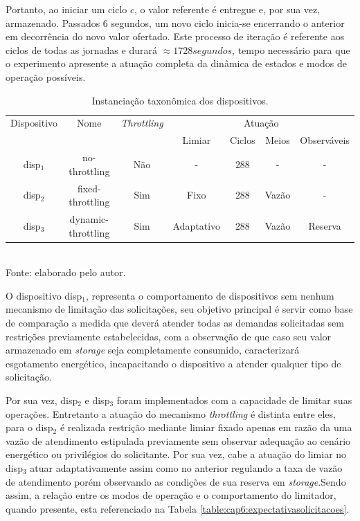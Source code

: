 Portanto, ao iniciar um ciclo $c$, o valor referente é entregue e, por sua vez, armazenado. Passados 6 segundos, um novo ciclo inicia-se encerrando o anterior em decorrência do novo valor ofertado. Este processo de iteração é referente aos ciclos de todas as jornadas e durará $\approx 1728 segundos$, tempo necessário para que o experimento apresente a atuação completa da dinâmica de estados e modos de operação possíveis.

\begingroup
\begin{table}[htbp]
	
	\centering
	\caption{Instanciação taxonômica dos dispositivos.}
	\small
	\begin{tabular}{ c c c c c c c}
		\toprule
		Dispositivo & Nome & \textit{Throttling} & \multicolumn{4}{c}{Atuação}\\\cline{4-7}		
		& & & Limiar & Ciclos & Meios & Observáveis\\
		\midrule
		disp$_1$ & no-throttling  & Não & - & 288 & - & - \\
		disp$_2$ & fixed-throttling  & Sim & Fixo & 288 & Vazão & - \\
		disp$_3$ & dynamic-throttling  & Sim & Adaptativo & 288 & Vazão & Reserva \\
		\bottomrule
	\end{tabular}
	\label{table:cap6:dispositivosutilizados}
	\\
	\footnotesize Fonte: elaborado pelo autor.
	
\end{table}
\endgroup

O dispositivo disp$_1$, representa o comportamento de dispositivos sem nenhum mecanismo de limitação das solicitações, seu objetivo principal é servir como base de comparação a medida que deverá atender todas as demandas solicitadas sem restrições previamente estabelecidas, com a observação de que caso seu valor armazenado em \textit{storage} seja completamente consumido, caracterizará esgotamento energético, incapacitando o dispositivo a atender qualquer tipo de solicitação.

Por sua vez, disp$_2$  e disp$_3$ foram implementados com a capacidade de limitar suas operações. Entretanto a atuação do mecanismo \textit{throttling} é distinta entre eles, para o disp$_2$ é realizada restrição mediante limiar fixado apenas em razão da uma vazão de atendimento estipulada previamente sem observar adequação ao cenário energético ou privilégios do solicitante. Por sua vez, cabe a atuação do limiar no disp$_3$ atuar adaptativamente assim como no anterior regulando a taxa de vazão de atendimento porém observando as condições de sua reserva em \textit{storage}.Sendo assim, a relação entre os modos de operação e o comportamento do limitador, quando presente, esta referenciado na Tabela \ref{table:cap6:expectativasolicitacoes}.

